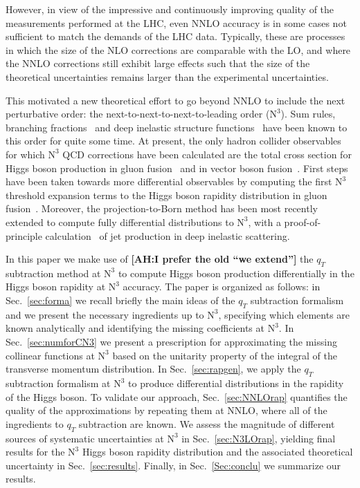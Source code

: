 \documentclass[12pt]{article}
\DeclareRobustCommand{\AH}[1]{\textbf{\quad\color{purple}[AH:\quad #1]}\xspace}
\DeclareRobustCommand{\qt}{\ensuremath{q_T}\xspace}
\DeclareRobustCommand{\LO}{\text{LO}\xspace}
\DeclareRobustCommand{\N}[1]{\ensuremath{\text{N}^{#1}}} %
\begin{document}
However, in view of the impressive and continuously improving quality of the measurements performed at the LHC, even NNLO accuracy is in some cases not sufficient to match the demands of the LHC data. Typically, these are processes in which the size of the NLO corrections are comparable with the LO, and where the NNLO corrections still exhibit large effects such that the size of the theoretical uncertainties remains larger than the experimental uncertainties. 

This motivated a new theoretical effort to go beyond NNLO to include the next perturbative order: the next-to-next-to-next-to-leading order (\N3\LO). Sum rules, branching fractions~\cite{Chetyrkin:1994js} and deep inelastic structure functions~\cite{Vermaseren:2005qc} have been known to this order for quite some time. At present, the only hadron collider observables for which \N3\LO QCD corrections have been calculated are the total cross section for Higgs boson  production in gluon fusion~\cite{Anastasiou:2015ema,Mistlberger:2018etf} and in vector boson 
fusion~\cite{Dreyer:2016oyx}. First steps have been taken towards more differential observables by computing the first \N3\LO threshold expansion terms to the Higgs boson rapidity distribution in gluon fusion~\cite{Dulat:2017prg}. Moreover, the projection-to-Born method has been most recently extended to compute fully differential distributions to \N3\LO, with a proof-of-principle calculation~\cite{Currie:2018fgr} of jet production in deep inelastic scattering. 

In this paper we make use of \AH{I prefer the old ``we extend''} the $\qt$ subtraction method at \N3\LO  to compute Higgs boson production differentially in the Higgs boson rapidity at \N3\LO accuracy. The paper is organized as follows: in Sec.~\ref{sec:forma} we recall briefly the main ideas of the $\qt$ subtraction formalism and we present the necessary ingredients up to  \N3\LO, specifying which elements are known analytically and identifying the missing coefficients at \N3\LO. In Sec.~\ref{sec:numforCN3} we present a prescription for approximating the missing collinear functions at \N3\LO based on the unitarity property of the integral of the transverse momentum distribution. In Sec.~\ref{sec:rapgen}, we apply the $\qt$ subtraction formalism at \N3\LO to produce differential distributions in the rapidity of the Higgs boson. To validate our approach, Sec.~\ref{sec:NNLOrap} quantifies the quality of the approximations by repeating them at NNLO, where all of the ingredients to $\qt$ subtraction are known. We assess the magnitude of different sources of systematic uncertainties at  \N3\LO in Sec.~\ref{sec:N3LOrap}, yielding final results for the \N3\LO Higgs boson rapidity distribution and the associated theoretical uncertainty in Sec.~\ref{sec:results}. Finally, in Sec.~\ref{Sec:conclu} we summarize our results.
\end{document}
